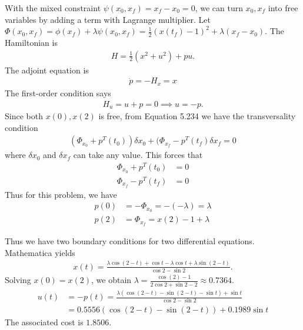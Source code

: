 \documentclass[12pt]{article}
\begin{document}
\begin{problem}[3]
With the mixed constraint $ \psi(x_0,x_f) = x_f - x_0 = 0$, we can turn $ x_0,x_f$ into free variables by adding a term with Lagrange multiplier. Let $ \Phi(x_0,x_f) = \phi(x_f) + \lambda \psi(x_0,x_f)= \frac{1}{2}(x(t_f)-1)^2 + \lambda(x_f - x_0)$. The Hamiltonian is
\begin{align*}
	H = \frac{1}{2} (x^2+u^2)+pu .
\end{align*}
The adjoint equation is
\begin{align*}
	\dot{p}= -H_x = x
\end{align*}
The first-order condition says
\begin{align*}
	H_u = u +p=0 \implies u = -p .
\end{align*}
Since both $x(0), x(2)$ is free, from Equation 5.234 we have the transversality condition
 \begin{align*}
	 (\Phi_{x_0}+p ^{T}(t_0)) \delta x_0 + (\Phi_{x_f}- p ^{T}(t_f)	\delta x_f = 0
\end{align*}
where $ \delta x_0$ and $ \delta x_f$ can take any value. This forces that
\begin{align*}
	\Phi_{x_0} + p ^{T}(t_0) &=0 \\
	\Phi_{x_f} - p ^{T}(t_f) &= 0 
\end{align*}
Thus for this problem, we have
\begin{align*}
	p(0) &= -\Phi_{x_0} = -(- \lambda ) = \lambda\\
	p(2) &= \Phi_{x_f} = x(2) -1 + \lambda  
\end{align*}

Thus we have two boundary conditions for two differential equations. Mathematica yields
\begin{align*}
	x(t) = \frac{\lambda \cos (2-t) + \cos t - \lambda \cos t + \lambda \sin (2-t)}{ \cos 2 - \sin 2 }.
\end{align*}
Solving $ x(0) = x(2)$, we obtain  $ \lambda = \frac{\cos(2)-1}{ 2 \cos 2 + \sin 2-2} \approx 0.7364$.
\begin{align*}
	u(t) &= -p(t) = \frac{\lambda (\cos(2-t)-\sin(2-t)-\sin t)+ \sin t}{\cos 2 - \sin 2 }\\
	&= 0.5556 (\cos(2-t)-\sin(2-t)) + 0.1989 \sin t
\end{align*}
The associated cost is $ 1.8506$.
\end{problem}
\end{document}

